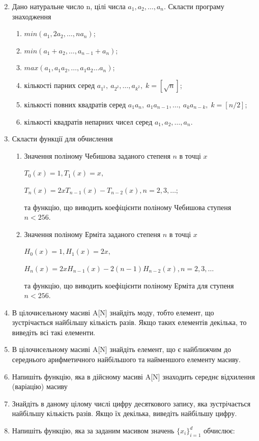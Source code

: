 \documentclass[a5paper,titlepage,openany,twoside,draft]{book_unv}%
\makeatletter
\newcommand{\xslalph}[1]{\expandafter\@xslalph\csname c@#1\endcsname}
\newcommand{\@xslalph}[1]{%
    \ifcase#1\or а\or б\or в\or г\or д\or e\or є\or ж\or з\or i%
    \or й\or к\or л\or м\or н\or о\or п\or р\or с\or т%
    \or у\or ф\or х\or ц\or ч\or ш\or ю\or я\or аа\or бб\or вв%
    \else\@ctrerr\fi%
}
\makeatother
\begin{document}
\begin{enumerate}
\begin{multicols}{2}
\begin{enumerate}[label=\xslalph*)]
\end{enumerate}
 \end{multicols}

\item Дано натуральне число n, цілі числа \(a_{1},a_{2},\ldots,a_{n}\).
Скласти програму знаходження
  \begin{multicols}{2}
\begin{enumerate}[label=\xslalph*)]
\item
 \(min(a_{1},2a_{2},\ldots,na_{n})\);
\item \(min(a_{1} + a_{2},\ldots,a_{n - 1} + a_{n})\);
\item \(max(a_{1},a_{1}a_{2},\ldots,a_{1}a_{2}\ldots a_{n})\);
\item кількості парних серед \(a_{1^2},\ a_{2^2},\ldots,a_{k^2},\; k=[\sqrt{n}] \);
\item кількості повних квадратів серед \(a_{1}a_{n},\ a_{1}a_{n-1},\ldots,\ a_{k}a_{n-k},\; k=[n/2]\);
\item кількості квадратів непарних чисел серед
\(a_{1},a_{2},\ldots,a_{n}\).
\end{enumerate}
\end{multicols}

\item
Скласти функції для обчислення
\begin{enumerate}[label=\xslalph*)]
\item
Значення поліному Чебишова заданого степеня \(n\) в точці \(x\)

\(T_{0}(x) = 1,T_{1}(x) = x,\)

\(T_{n}(x) = 2xT_{n - 1}(x) - T_{n - 2}(x),n = 2,3,\ldots;\)

та функцію, що виводить коефіцієнти поліному Чебишова ступеня $n<256$.

\item
Значення поліному Ерміта заданого степеня \(n\) в точці \(x\)

\(H_{0}(x) = 1,H_{1}(x) = 2x,\)

\(H_{n}(x) = 2xH_{n - 1}(x) - 2(n - 1)H_{n - 2}(x),n = 2,3,\ldots\)

та функцію, що виводить коефіцієнти поліному Ерміта для ступеня $n<256$.
\end{enumerate}
\item
  В цілочисельному масиві A{[}N{]} знайдіть моду, тобто елемент, що
  зустрічається найбільшу кількість разів. Якщо таких елементів декілька,
  то виведіть всі такі елементи.

\item
  В цілочисельному масиві A{[}N{]} знайдіть елемент, що є найближчим до
  середнього арифметичного найбільшого та найменшого елементу масиву.
\item
  Напишіть функцію, яка в дійсному масиві A{[}N{]} знаходить середнє
  відхилення (варіацію) масиву
\item
  Знайдіть в даному цілому числі цифру десяткового запису, яка
  зустрічається найбільшу кількість разів. Якщо їх декілька, виведіть
  найбільшу цифру.
\item
  Напишіть функцію, яка за заданим масивом значень
  \({\{ x_{i}\}}_{i = 1}^{d}\) обчислює:


\end{enumerate}
\end{document}
